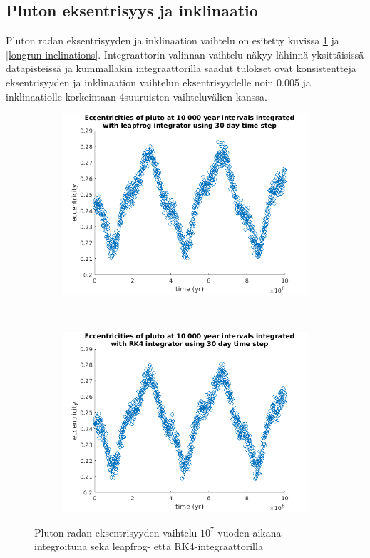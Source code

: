 \documentclass[12pt,a4paper,titlepage]{article}
\begin{document}
\subsection{Pluton eksentrisyys ja inklinaatio}
Pluton radan eksentrisyyden ja inklinaation vaihtelu on esitetty kuvissa \ref{longrun-eccentricities} ja \ref{longrun-inclinations}. Integraattorin valinnan vaihtelu näkyy lähinnä yksittäisissä datapisteissä ja kummallakin integraattorilla saadut tulokset ovat konsistentteja eksentrisyyden ja inklinaation vaihtelun eksentrisyydelle noin 0.005 ja inklinaatiolle korkeintaan 4\textdegree suuruisten vaihteluvälien kanssa.

\begin{figure}[h!]
    \centering
    \begin{subfigure}[b]{0.8\textwidth}
        \includegraphics[width=\textwidth]{../plots/lf-longrun-eccentricity.png}
    \end{subfigure}
    \\
    \begin{subfigure}[b]{0.8\textwidth}
        \includegraphics[width=\textwidth]{../plots/rk-longrun-eccentricity.png}
    \end{subfigure}
    \caption{Pluton radan eksentrisyyden vaihtelu $10^7$ vuoden aikana integroituna sekä leapfrog- että RK4-integraattorilla}\label{longrun-eccentricities}
\end{figure}
\end{document}
